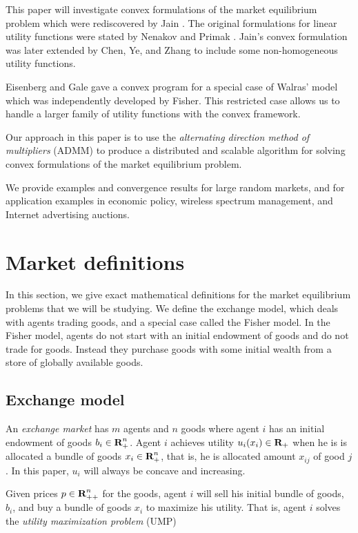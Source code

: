 \documentclass[12pt]{article}
\begin{document}
This paper will investigate convex formulations of the market
equilibrium problem which were rediscovered by Jain \cite{jain2007polynomial}.
The original formulations for linear utility functions
were stated by Nenakov and Primak \cite{nenakov1983algorithm}.
Jain's convex formulation was later extended by Chen, Ye, and Zhang \cite{chen2007note, chen2010equilibrium} to include some non-homogeneous
utility functions.

Eisenberg and Gale \cite{eisenberg1959consensus, gale1960theory, eisenberg1961aggregation} gave a convex program for a special case of Walras' model which was independently developed by Fisher. %
This restricted case allows us to handle a larger family of utility functions
with the convex framework.

Our approach in this paper is to use the \emph{alternating direction method of multipliers} (ADMM) \cite{boyd2011distributed} to produce a distributed and scalable algorithm for solving convex formulations of the market equilibrium problem.

We provide examples and convergence results for large random markets, and 
for application examples in economic policy, wireless spectrum management,
and Internet advertising auctions.

\section{Market definitions}
In this section, we give exact mathematical definitions for the market equilibrium problems that we will be studying. We define the exchange model,
which deals with agents trading goods, and a special case called the Fisher model. In the Fisher model, agents do not start with an initial endowment of
goods and do not trade for goods. Instead they purchase goods with some
initial wealth from a store of globally available goods.

\subsection{Exchange model}
An \emph{exchange market} has $m$ agents and $n$ goods where
agent $i$ has an initial endowment of goods $b_i \in {\mbox{\bf R}}_+^n$.
Agent $i$ achieves utility $u_i(x_i) \in {\mbox{\bf R}}_+$ when he is is allocated a
bundle of goods $x_i \in {\mbox{\bf R}}^n_{+}$,
that is, he is allocated amount $x_{ij}$ of good $j$.
In this paper, $u_i$ will always be concave and increasing.

Given prices $p \in {\mbox{\bf R}}^n_{++}$ for the goods, agent $i$ will sell his
initial bundle of goods, $b_i$, and buy a bundle of goods
$x_i$ to maximize his utility.
That is, agent $i$ solves the \emph{utility maximization problem} (UMP)
\end{document}
